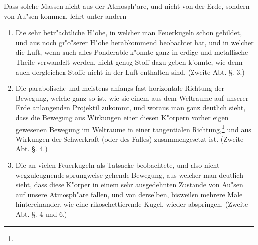 \documentclass[a4paper, 11pt, oneside, polutonikogreek, german]{article}
\begin{document}
Dass solche Massen nicht aus der Atmosph"are, und nicht von der Erde, sondern von Au"sen kommen, lehrt unter andern
\begin{enumerate}
    \item Die sehr betr"achtliche H"ohe, in welcher man Feuerkugeln schon gebildet, und aus noch gr"o"serer H"ohe herabkommend beobachtet hat, und in welcher die Luft, wenn auch alles Ponderable k"onnte ganz in erdige und metallische Theile verwandelt werden, nicht genug Stoff dazu geben k"onnte, wie denn auch dergleichen Stoffe nicht in der Luft enthalten sind. (Zweite Abt. §. 3.)
    \item Die parabolische und meistens anfangs fast horizontale Richtung der Bewegung, welche ganz so ist, wie sie einem aus dem Weltraume auf unserer Erde anlangenden Projektil zukommt, und woraus man ganz deutlich sieht, dass die Bewegung aus Wirkungen einer diesen K"orpern vorher eigen gewesenen Bewegung im Weltraume in einer tangentialen Richtung,\footnote{} und aus Wirkungen der Schwerkraft (oder des Falles) zusammengesetzt ist. (Zweite Abt. §. 4.)
    \item Die an vielen Feuerkugeln als Tatsache beobachtete, und also nicht wegzuleugnende sprungweise gehende Bewegung, aus welcher man deutlich sieht, dass diese K"orper in einem sehr ausgedehnten Zustande von Au"sen auf unsere Atmosph"are fallen, und von derselben, bisweilen mehrere Male hintereinander, wie eine rikoschettierende Kugel, wieder abspringen. (Zweite Abt. §. 4 und 6.)

\end{enumerate}
\end{document}
